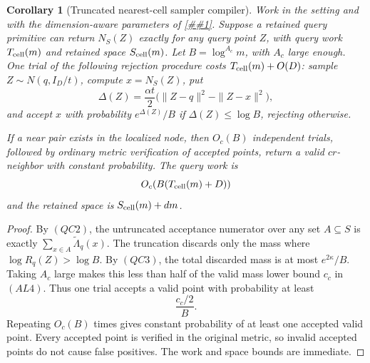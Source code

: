 \documentclass[10pt]{article}
\newcommand{\cref}[1]{\ref{##1}}
\newtheorem{corollary}[theorem]{Corollary}
\theoremstyle{definition}
\begin{document}
\begin{corollary}[Truncated nearest-cell sampler compiler]
   \label{cor:truncated-nearest-cell-compiler}
   Work in the setting and with the dimension-aware parameters of
   \cref{cor:query-centered-cell-reweighting}.  Suppose a retained query
   primitive can return \(N_S(Z)\) exactly for any query point \(Z\), with
   query work \(T_{\rm cell}(m)\) and retained space \(S_{\rm cell}(m)\).
   Let \(B=\log^{A_c}m\), with \(A_c\) large enough.  One trial of the
   following rejection procedure costs \(T_{\rm cell}(m)+O(D)\):
   sample \(Z\sim N(q,I_D/t)\), compute \(x=N_S(Z)\), put
   \[
      \Delta(Z)=
      \frac{\alpha t}{2}
      \bigl(\|Z-q\|^2-\|Z-x\|^2\bigr),
   \]
   and accept \(x\) with probability \(e^{\Delta(Z)}/B\) if
   \(\Delta(Z)\le\log B\), rejecting otherwise.

   If a near pair exists in the localized node, then
   \(O_c(B)\) independent trials, followed by ordinary metric verification of
   accepted points, return a valid \(cr\)-neighbor with constant probability.
   The query work is
   \[
      O_c\!\left(B(T_{\rm cell}(m)+D)\right)
   \]
   and the retained space is \(S_{\rm cell}(m)+dm\).
\end{corollary}

\begin{proof}
   By \((QC2)\), the untruncated acceptance numerator over any set
   \(A\subseteq S\) is exactly \(\sum_{x\in A}\widetilde\Lambda_q(x)\).  The
   truncation discards only the mass where \(\log R_q(Z)>\log B\).  By
   \((QC3)\), the total discarded mass is at most \(e^{2\kappa}/B\).  Taking
   \(A_c\) large makes this less than half of the valid mass lower bound
   \(c_c\) in \((AL4)\).  Thus one trial accepts a valid point with probability
   at least
   \[
      \frac{c_c/2}{B}.
   \]
   Repeating \(O_c(B)\) times gives constant probability of at least one
   accepted valid point.  Every accepted point is verified in the original
   metric, so invalid accepted points do not cause false positives.  The work
   and space bounds are immediate.
\end{proof}
\end{document}

